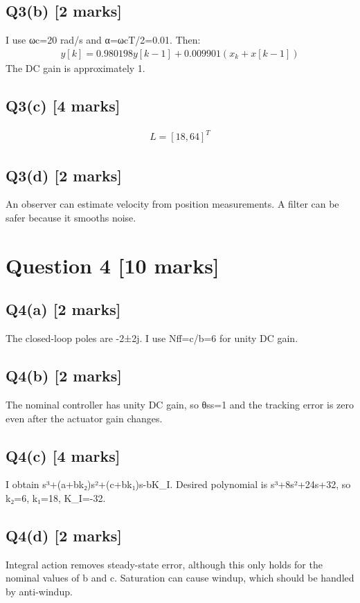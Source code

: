\documentclass[11pt,a4paper]{article}
\begin{document}
\subsection*{Q3(b) \hfill [2 marks]}

I use ωc=20 rad/s and α=ωcT/2=0.01.
Then:\[\begin{aligned}y[k] = 0.980198y[k-1] + 0.009901(x_k+x[k-1])\end{aligned}\]
The DC gain is approximately 1.

\subsection*{Q3(c) \hfill [4 marks]}

\[\begin{aligned}L = [18,64]^T\end{aligned}\]

\subsection*{Q3(d) \hfill [2 marks]}

An observer can estimate velocity from position measurements.
A filter can be safer because it smooths noise.

\section*{Question 4 \hfill [10 marks]}
\subsection*{Q4(a) \hfill [2 marks]}

The closed-loop poles are -2±2j.
I use Nff=c/b=6 for unity DC gain.

\subsection*{Q4(b) \hfill [2 marks]}

The nominal controller has unity DC gain, so θss=1 and the tracking error is zero even after the actuator gain changes.

\subsection*{Q4(c) \hfill [4 marks]}

I obtain s³+(a+bk₂)s²+(c+bk₁)s-bK\_I.
Desired polynomial is s³+8s²+24s+32, so k₂=6, k₁=18, K\_I=-32.

\subsection*{Q4(d) \hfill [2 marks]}

Integral action removes steady-state error, although this only holds for the nominal values of b and c.
Saturation can cause windup, which should be handled by anti-windup.
\end{document}
